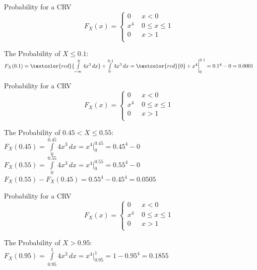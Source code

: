 \documentclass[10pt,sans,english,compress,table,xcolor=dvipsnames]{beamer}
\begin{document}
\begin{frame}[fragile]{Probability for a CRV}
\begin{equation}\nonumber
F_X(x) = 
\begin{cases}
     0\; & x < 0\\[1ex] 
  x^4\; & 0\leq x \leq 1 \\[2ex]
  0\; & x>1 \\[2ex]
\end{cases}
\end{equation}

The Probability of $X\leq0.1$:\\[1ex]
$F_X(0.1) = \textcolor{red}{\int\limits_{-\infty}^{0} 4x^3 \,dx} + \int\limits_{0}^{0.1} 4x^3 \,dx = \textcolor{red}{0}+ x^4\bigg|^{0.1}_{0} = 0.1^4 -0 = 0.0001$\\[2ex]


\end{frame}

\begin{frame}[fragile]{Probability for a CRV}
\begin{equation}\nonumber
F_X(x) = 
\begin{cases}
     0\; & x < 0\\[1ex] 
  x^4\; & 0\leq x \leq 1 \\[2ex]
  0\; & x>1 \\[2ex]
\end{cases}
\end{equation}

The Probability of $0.45< X\leq 0.55$:\\[1ex]
$F_X(0.45) =  \int\limits_{0}^{0.45} 4x^3 \,dx =  x^4\bigg|^{0.45}_{0} = 0.45^4 -0 $\\[2ex]
$F_X(0.55) =  \int\limits_{0}^{0.55} 4x^3 \,dx =  x^4\bigg|^{0.55}_{0} = 0.55^4 -0 $\\[2ex]

$F_X(0.55)- F_X(0.45) =  0.55^4 - 0.45^4 = 0.0505$\\[1ex]


\end{frame}

\begin{frame}[fragile]{Probability for a CRV}
\begin{equation}\nonumber
F_X(x) = 
\begin{cases}
     0\; & x < 0\\[1ex] 
  x^4\; & 0\leq x \leq 1 \\[2ex]
  0\; & x>1 \\[2ex]
\end{cases}
\end{equation}

The Probability of $X>0.95$:\\[1ex]
$F_X(0.95) =  \int\limits_{0.95}^{1} 4x^3 \,dx =  x^4\bigg|^{1}_{0.95} = 1 - 0.95^4 = 0.1855 $\\[2ex]


\end{frame}
\end{document}
